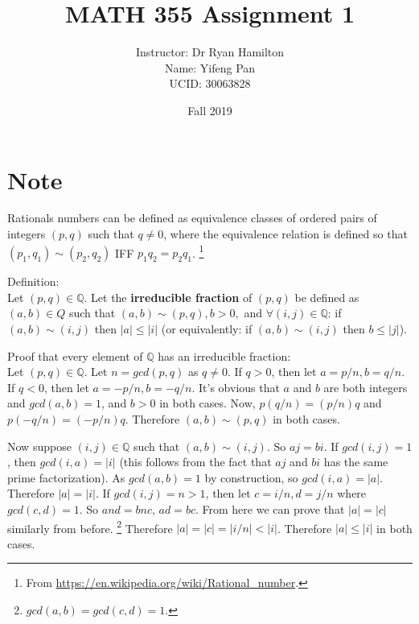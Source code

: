 \documentclass[10pt, letterpaper, titlepage]{article}
\title{MATH 355 Assignment 1}
\author{Instructor: Dr Ryan Hamilton
    \\Name: Yifeng Pan
    \\UCID: 30063828}
\date{Fall 2019}
\newcommand\abs[1]{\left|#1\right|}
\newcommand{\Q}{\mathbb{Q}}
\begin{document}
    \maketitle
    
    

    \newpage
    

    

    \newpage
    

    \newpage
    

    


    \section*{Note}
    \label{proof:IF}
    Rationals numbers can be defined as equivalence classes of ordered pairs of integers 
    $(p,q)$ such that $q \neq 0$, 
    where the equivalence relation is defined so that 
    $(p_1,q_1) \sim (p_2,q_2)$ IFF $p_1q_2 = p_2q_1$.
    \footnote{From \url{https://en.wikipedia.org/wiki/Rational_number}.}

    Definition: \\ 
    Let $(p,q) \in \Q$. Let the \textbf{irreducible fraction} of $(p,q)$ be defined as 
    $(a,b) \in Q$ such that $(a,b) \sim (p,q), b > 0,$ and $\forall (i,j) \in \Q$:
    if $(a,b) \sim (i,j)$ then $\abs{a} \leq \abs{i}$
    (or equivalently: if $(a,b) \sim (i,j)$ then $b \leq \abs{j}$).
    

    Proof that every element of $\Q$ has an irreducible fraction: \\ 
    Let $(p,q) \in \Q$. 
    Let $n = gcd(p,q)$ as $q \neq 0$.
    If $q > 0$, then let $a = p/n, b = q/n$.
    If $q < 0$, then let $a = -p/n, b = -q/n$.
    It's obvious that $a$ and $b$ are both integers and $gcd(a,b) = 1$,
    and $b > 0$ in both cases.
    Now, $p (q / n) = (p / n) q$ and $p (- q / n) = (- p / n) q$.
    Therefore $(a,b) \sim (p,q)$ in both cases.

    Now suppose $(i,j) \in \Q$ such that $(a,b) \sim (i,j)$.
    So $aj = bi$.
    If $gcd(i,j) = 1$, then $gcd(i,a) = \abs{i}$ 
    (this follows from the fact that $aj$ and $bi$ has the same prime factorization).
    As $gcd(a,b) = 1$ by construction, so $gcd(i,a) = \abs{a}$.
    Therefore $\abs{a} = \abs{i}$.
    If $gcd(i,j) = n > 1$, 
    then let $c = i/n, d = j/n$
    where $gcd(c,d) = 1$.
    So $and = bnc$, $ad = bc$.
    From here we can prove that $\abs{a} = \abs{c}$
    similarly from before.
    \footnote{$gcd(a,b) = gcd(c,d) = 1$.}
    Therefore
    $\abs{a} = \abs{c} = \abs{i/n} < \abs{i}$.
    Therefore $\abs{a} \leq \abs{i}$ in both cases.
\end{document}
